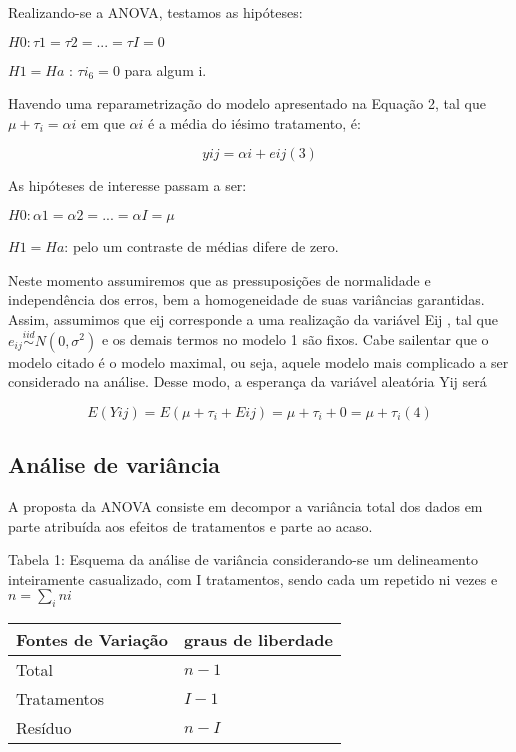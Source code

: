\documentclass[
]{book}
\begin{document}
Realizando-se a ANOVA, testamos as hipóteses:

\(H0 : \tau1 = \tau2 = ... = \tau I = 0\)

\(H1 = Ha\) : \(\tau i_6 = 0\) para algum i.

Havendo uma reparametrização do modelo apresentado na Equação 2, tal que \(\mu + \tau_i = \alpha i\) em que \(\alpha i\) é a média do iésimo tratamento, é:

\[yij = \alpha i + eij  (3)\]

As hipóteses de interesse passam a ser:

\(H0 : \alpha1 = \alpha2 = ... = \alpha I = \mu\)

\(H1 = Ha\): pelo um contraste de médias difere de zero.

Neste momento assumiremos que as pressuposições de normalidade e independência dos erros, bem a homogeneidade de suas variâncias garantidas. Assim, assumimos que eij corresponde a uma realização da variável Eij , tal que \(e_{ij} \overset{iid}{\sim} N(0,\sigma^2)\) e os demais termos no modelo 1 são fixos. Cabe sailentar que o modelo citado é o modelo maximal, ou seja, aquele modelo mais complicado a ser considerado na análise.
Desse modo, a esperança da variável aleatória Yij será

\[E(Yij ) = E(\mu + \tau_i + Eij ) = \mu + \tau_i + 0 = \mu + \tau_i (4)\]

\hypertarget{anuxe1lise-de-variuxe2ncia}{%
\subsection{Análise de variância}\label{anuxe1lise-de-variuxe2ncia}}

A proposta da ANOVA consiste em decompor a variância total dos dados em parte atribuída aos efeitos de tratamentos e parte ao acaso.

Tabela 1: Esquema da análise de variância considerando-se um delineamento inteiramente casualizado, com I tratamentos, sendo cada um repetido ni vezes e \(n = \sum_i ni\)

\begin{longtable}[]{@{}ll@{}}
\toprule()
Fontes de Variação & graus de liberdade \\
\midrule()
\endhead
Total & \(n-1\) \\
Tratamentos & \(I-1\) \\
Resíduo & \(n-I\) \\
\bottomrule()
\end{longtable}
\end{document}
